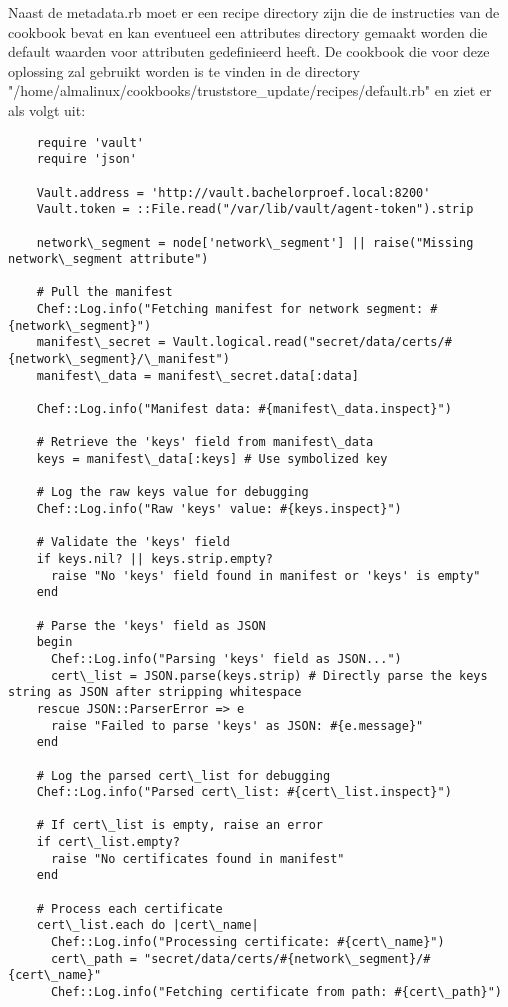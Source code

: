 Naast de metadata.rb moet er een recipe directory zijn die de instructies van de cookbook bevat en kan eventueel een attributes directory gemaakt worden die default waarden voor attributen gedefinieerd heeft.
De cookbook die voor deze oplossing zal gebruikt worden is te vinden in de directory "/home/almalinux/cookbooks/truststore\_update/recipes/default.rb" en ziet er als volgt uit:

\begin{verbatim}
    require 'vault'
    require 'json'
    
    Vault.address = 'http://vault.bachelorproef.local:8200'
    Vault.token = ::File.read("/var/lib/vault/agent-token").strip
    
    network\_segment = node['network\_segment'] || raise("Missing network\_segment attribute")
    
    # Pull the manifest
    Chef::Log.info("Fetching manifest for network segment: #{network\_segment}")
    manifest\_secret = Vault.logical.read("secret/data/certs/#{network\_segment}/\_manifest")
    manifest\_data = manifest\_secret.data[:data]
    
    Chef::Log.info("Manifest data: #{manifest\_data.inspect}")
    
    # Retrieve the 'keys' field from manifest\_data
    keys = manifest\_data[:keys] # Use symbolized key
    
    # Log the raw keys value for debugging
    Chef::Log.info("Raw 'keys' value: #{keys.inspect}")
    
    # Validate the 'keys' field
    if keys.nil? || keys.strip.empty?
      raise "No 'keys' field found in manifest or 'keys' is empty"
    end
    
    # Parse the 'keys' field as JSON
    begin
      Chef::Log.info("Parsing 'keys' field as JSON...")
      cert\_list = JSON.parse(keys.strip) # Directly parse the keys string as JSON after stripping whitespace
    rescue JSON::ParserError => e
      raise "Failed to parse 'keys' as JSON: #{e.message}"
    end
    
    # Log the parsed cert\_list for debugging
    Chef::Log.info("Parsed cert\_list: #{cert\_list.inspect}")
    
    # If cert\_list is empty, raise an error
    if cert\_list.empty?
      raise "No certificates found in manifest"
    end
    
    # Process each certificate
    cert\_list.each do |cert\_name|
      Chef::Log.info("Processing certificate: #{cert\_name}")
      cert\_path = "secret/data/certs/#{network\_segment}/#{cert\_name}"
      Chef::Log.info("Fetching certificate from path: #{cert\_path}")
    

\end{verbatim}
